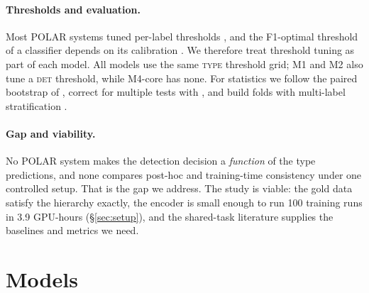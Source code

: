 \documentclass[11pt]{article}
\newcommand{\DET}{\textsc{det}}
\newcommand{\TYPE}{\textsc{type}}
\begin{document}
\paragraph{Thresholds and evaluation.}
Most POLAR systems tuned per-label thresholds
\citep{naseem-etal-2026-semeval}, and the F1-optimal threshold of a
classifier depends on its calibration \citep{lipton2014thresholding}. We
therefore treat threshold tuning as part of each model. All models use the
same \TYPE{} threshold grid; M1 and M2 also tune a \DET{} threshold, while
M4-core has none. For statistics we follow the paired bootstrap of
\citet{koehn-2004-statistical}, correct for multiple tests with
\citet{holm1979}, and build folds with multi-label stratification
\citep{sechidis2011}.

\paragraph{Gap and viability.}
No POLAR system makes the detection decision a \emph{function} of the type
predictions, and none compares post-hoc and training-time consistency under
one controlled setup. That is the gap we address. The study is viable: the
gold data satisfy the hierarchy exactly, the encoder is small enough to run
100 training runs in 3.9 GPU-hours (\S\ref{sec:setup}), and the shared-task
literature supplies the baselines and metrics we need.

\section{Models}
\label{sec:models}
\end{document}
